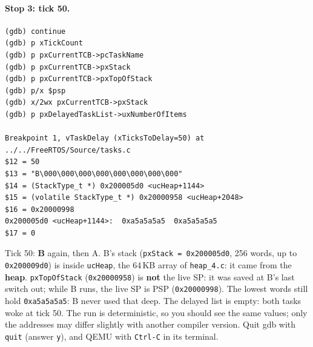 \paragraph{Stop 3: tick 50.}
{\verbatimscriptsize
\begin{verbatim}
(gdb) continue
(gdb) p xTickCount
(gdb) p pxCurrentTCB->pcTaskName
(gdb) p pxCurrentTCB->pxStack
(gdb) p pxCurrentTCB->pxTopOfStack
(gdb) p/x $psp
(gdb) x/2wx pxCurrentTCB->pxStack
(gdb) p pxDelayedTaskList->uxNumberOfItems

Breakpoint 1, vTaskDelay (xTicksToDelay=50) at ../../FreeRTOS/Source/tasks.c
$12 = 50
$13 = "B\000\000\000\000\000\000\000\000"
$14 = (StackType_t *) 0x200005d0 <ucHeap+1144>
$15 = (volatile StackType_t *) 0x20000958 <ucHeap+2048>
$16 = 0x20000998
0x200005d0 <ucHeap+1144>:  0xa5a5a5a5  0xa5a5a5a5
$17 = 0
\end{verbatim}}
Tick 50: \textbf{B} again, then A. B's stack (\texttt{pxStack = 0x200005d0}, 256 words, up to \texttt{0x200009d0}) is inside \texttt{ucHeap}, the 64\,KB array of \texttt{heap\_4.c}: it came from the \textbf{heap}. \texttt{pxTopOfStack} (\texttt{0x20000958}) is \textbf{not} the live SP: it was saved at B's last switch out; while B runs, the live SP is PSP (\texttt{0x20000998}). The lowest words still hold \texttt{0xa5a5a5a5}: B never used that deep. The delayed list is empty: both tasks woke at tick 50.
The run is deterministic, so you should see the same values; only the addresses may differ slightly with another compiler version. Quit gdb with \texttt{quit} (answer \texttt{y}), and QEMU with \texttt{Ctrl-C} in its terminal.

